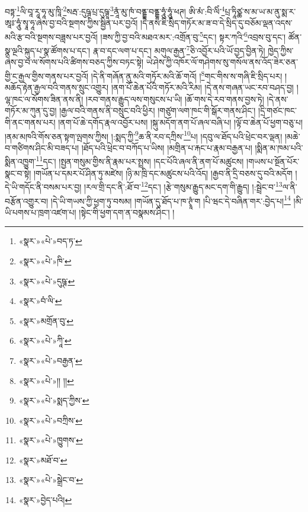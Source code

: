 བཏྟ་\footnote{«སྣར་»«པེ་»བད་ཏ་}ལི་བཱ་རཱ་ཧཱ་མུ་ཁཱི་\footnote{«སྣར་»«པེ་»ཁི་}སརྦ་:དུཥྚ་པྲ་དུཥྚཱ་\footnote{«སྣར་»«པེ་»དུཥྚ་}ནཱཾ་མུ་ཁཾ་བནྡྷ་བནྡྷ་ཧཱུཾ་ཧཱུཾ་ཕཊ། ཨི་མཾ་:བི་ལིཾ་\footnote{«སྣར་»བཾ་ལི་}པྲ་ཏཱིཙྪ་ས་མ་ཡ་མ་ནུ་སྨ་ར་ཨཱཿ་ཧཱུཾ་སྭཱ་ཧཱ་ཞེས་བྱ་བའི་སྔགས་ཀྱིས་སྦྱིན་པར་བྱའོ། །དེ་ནས་ཇི་སྲིད་གཏོར་མ་ཟ་བ་དེ་སྲིད་དུ་བཅོམ་ལྡན་འདས་མའི་རྩ་བའི་སྔགས་བཟླས་པར་བྱའོ། །ཟས་ཀྱི་བྱ་བའི་མཐའ་མར་:འགྲོན་བུ་\footnote{«སྣར་»མགྲོན་བུ་}དང་། སྟར་ཀའི་\footnote{«སྣར་»«པེ་»ཀཱི་}འབྲས་བུ་དང་། ཚོན་སྣ་ལྔའི་སྐུད་པ་སྣ་ཚོགས་པ་དང་། རྣ་བ་དང་ལག་པ་དང་། མགུལ་རྒྱན་\footnote{«སྣར་»«པེ་»བརྒྱན་}ཅི་འབྱོར་པའི་ཡོ་བྱད་བྱིན་ཏེ། ཁྱེད་ཀྱིས་ཞེས་བྱ་བ་ལ་སོགས་པའི་ཚིགས་བཅད་ཀྱིས་བཏང་སྟེ། ཡེ་ཤེས་ཀྱི་འཁོར་ལོ་གཤེགས་སུ་གསོལ་ནས་འོད་ཟེར་ཅན་གྱི་ང་རྒྱལ་གྱིས་གནས་པར་བྱའོ། །དེ་ནི་གཞོན་ནུ་མའི་གཏོར་མའི་ཆོ་གའོ། །\footnote{«སྣར་»«པེ་»།། །།}གང་གིས་ས་གཞི་ཇི་སྲིད་པར། །མཆོད་རྟེན་རྒྱལ་བའི་གནས་སྲུང་འགྱུར། །ནག་པོ་ཆེན་པོའི་གཏོར་མའི་རིམ། །དེ་ནས་གཞན་ཡང་རབ་བཤད་བྱ། །ལྷ་ཁང་ལ་སོགས་ཟིན་ནས་ནི། །རབ་གནས་རྒྱུད་ལས་གསུངས་པ་ཡི། །ཆོ་གས་དེ་རབ་གནས་བྱས་ཏེ། །དེ་ནས་གཏོར་མ་ཀུན་དུ་བྱ། །རྒྱལ་བའི་གནས་ནི་བསྲུང་བའི་ཕྱིར། །གཙུག་ལག་ཁང་གི་སྒོར་གནས་ཤིང་། །དྲི་གཙང་ཁང་གི་ནང་གནས་པར། །ནག་པོ་ཆེ་དགོད་རྣལ་འབྱོར་པས། །སྐུ་མདོག་ནག་པོ་ཞལ་བཞི་པ། །ལྟོ་བ་ཆེན་པོ་ཕྱག་བཅུ་པ། །ནམ་མཁའི་གོས་ཅན་སྟག་ལྤགས་ཀྱིས། །:སྨད་ཀྱི་\footnote{«སྣར་»«པེ་»སྨད་ཀྱིས་}ཆ་ནི་རབ་དཀྲིས་\footnote{«སྣར་»«པེ་»བཀྲིས་}པ། །དབུ་ལ་ཐོད་པའི་ཕྲེང་བར་ལྡན། །མཆེ་བ་གཙིགས་ཤིང་མི་བཟད་པ། །ཐོད་པའི་ཕྲེང་བ་བཀོད་པ་ཡིས། །མགྲིན་པ་རྐང་པ་རྣམ་བརྒྱན་པ། །སྨིན་མ་ཁམ་པའི་སྨིན་འཁྱུག་\footnote{«སྣར་»«པེ་»ཁྱུགས་}དང་། །སྤྱན་གསུམ་གྱིས་ནི་རྣམ་པར་སྤྲས། །དང་པོའི་ཞལ་ནི་ནག་པོ་མཚུངས། །གཡས་པ་སྔོན་པོར་སྣང་བ་སྟེ། །གཡོན་པ་དམར་པོ་ཤིན་ཏུ་མཛེས། །ཉི་མ་ཁྲི་དང་མཚུངས་པའི་འོད། །རྒྱབ་ནི་དྲི་བཅས་དུ་བའི་མདོག །དེ་ཡི་གདོང་ནི་བསམ་པར་བྱ། །རལ་གྲི་དང་ནི་:ཐོ་བ་\footnote{«སྣར་»མཐོ་བ་}དང་། །རྩེ་གསུམ་རྒྱུད་མང་དག་གི་རྒྱུད། །:སྦྲེང་བ་\footnote{«སྣར་»«པེ་»སྒྲེང་བ་}ལ་ནི་བརྩོན་འགྱུར་བ། །དེ་ཡི་གཡས་ཀྱི་ཕྱག་ཏུ་བསམ། །གཡོན་དུ་ཐོད་པ་ཁ་ཊྭཱཾ་ག །པི་ཝང་དེ་བཞིན་གར་:བྱེད་པ།\footnote{«སྣར་»བྱེད་པའི།} །མི་ཡི་པགས་པ་ཁྲག་འཛག་པ། །སྟེང་གི་ཕྱག་དག་ན་བསྣམས་ཤིང་། །
